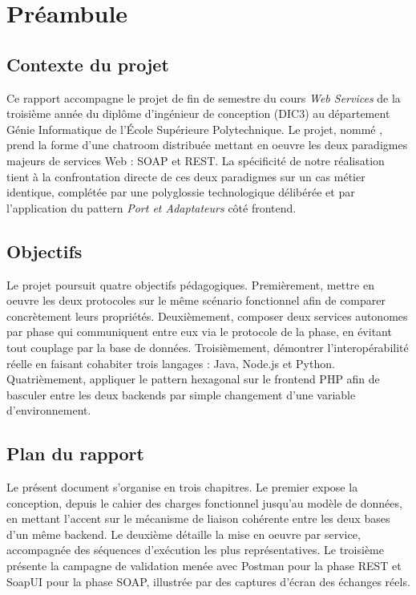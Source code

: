 \section*{Préambule}

\subsection*{Contexte du projet}

Ce rapport accompagne le projet de fin de semestre du cours \emph{Web Services} de la troisième année du diplôme d'ingénieur de conception (DIC3) au département Génie Informatique de l'École Supérieure Polytechnique. Le projet, nommé , prend la forme d'une chatroom distribuée mettant en oeuvre les deux paradigmes majeurs de services Web : SOAP et REST. La spécificité de notre réalisation tient à la confrontation directe de ces deux paradigmes sur un cas métier identique, complétée par une polyglossie technologique délibérée et par l'application du pattern \emph{Port et Adaptateurs} côté frontend.

\subsection*{Objectifs}

Le projet poursuit quatre objectifs pédagogiques. Premièrement, mettre en oeuvre les deux protocoles sur le même scénario fonctionnel afin de comparer concrètement leurs propriétés. Deuxièmement, composer deux services autonomes par phase qui communiquent entre eux via le protocole de la phase, en évitant tout couplage par la base de données. Troisièmement, démontrer l'interopérabilité réelle en faisant cohabiter trois langages : Java, Node.js et Python. Quatrièmement, appliquer le pattern hexagonal sur le frontend PHP afin de basculer entre les deux backends par simple changement d'une variable d'environnement.

\subsection*{Plan du rapport}

Le présent document s'organise en trois chapitres. Le premier expose la conception, depuis le cahier des charges fonctionnel jusqu'au modèle de données, en mettant l'accent sur le mécanisme de liaison cohérente entre les deux bases d'un même backend. Le deuxième détaille la mise en oeuvre par service, accompagnée des séquences d'exécution les plus représentatives. Le troisième présente la campagne de validation menée avec Postman pour la phase REST et SoapUI pour la phase SOAP, illustrée par des captures d'écran des échanges réels.

